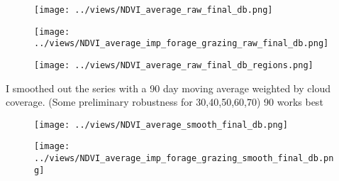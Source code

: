 \documentclass[10pt,a4paper,onecolumn]{article}
\begin{document}





  \begin{figure}[H] \centering
            \captionsetup{justification=centering}
              \texttt{[image: ../views/NDVI\_average\_raw\_final\_db.png]}
              
 \end{figure}



  \begin{figure}[H] \centering
            \captionsetup{justification=centering}
              \texttt{[image: ../views/NDVI\_average\_imp\_forage\_grazing\_raw\_final\_db.png]}
              
 \end{figure}


  \begin{figure}[H] \centering
            \captionsetup{justification=centering}
              \texttt{[image: ../views/NDVI\_average\_raw\_final\_db\_regions.png]}
              
 \end{figure}


I smoothed out the series with a 90 day moving average weighted by cloud coverage. (Some preliminary robustness for 30,40,50,60,70) 90 works best

  \begin{figure}[H] \centering
            \captionsetup{justification=centering}
              \texttt{[image: ../views/NDVI\_average\_smooth\_final\_db.png]}
              
 \end{figure}



  \begin{figure}[H] \centering
            \captionsetup{justification=centering}
              \texttt{[image: ../views/NDVI\_average\_imp\_forage\_grazing\_smooth\_final\_db.png]}
              
 \end{figure}
\end{document}
